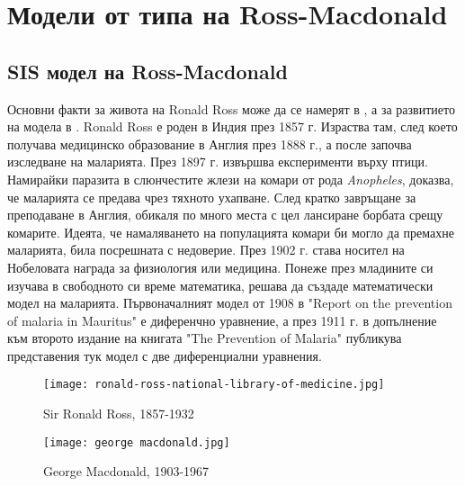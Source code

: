 \section{\hspace{1em} Модели от типа на Ross-Macdonald}

\subsection{SIS модел на Ross-Macdonald}

Основни факти за живота на Ronald Ross може да се намерят в \cite[глава~12]{Bacaer2011}, а за развитието на модела в \cite{Smith2012}.
Ronald Ross е роден в Индия през 1857 г.
Израства там, след което получава медицинско образование в Англия през 1888 г., а после започва изследване на маларията.
През 1897 г. извършва експерименти върху птици.
Намирайки паразита в слюнчестите жлези на комари от рода \textit{Anopheles}, доказва, че маларията се предава чрез тяхното ухапване.
След кратко завръщане за преподаване в Англия, обикаля по много места с цел лансиране борбата срещу комарите. Идеята, че намаляването на популацията комари би могло да премахне маларията, била посрешната с недоверие.
През 1902 г. става носител на Нобеловата награда за физиология или медицина.
Понеже през младините си изучава в свободното си време математика, решава да създаде математически модел на маларията.
Първоначалният модел от 1908 в "Report on the prevention of malaria in Mauritus" е диференчно уравнение, а през 1911 г. в допълнение към второто издание на книгата "The Prevention of Malaria" публикува представения тук модел с две диференциални уравнения.



\begin{figure}[H]
  \centering
  \begin{minipage}{.5\textwidth}
    \centering
    \texttt{[image: ronald-ross-national-library-of-medicine.jpg]}
    \caption{Sir Ronald Ross, 1857-1932}
    \label{fig:Ross}
    \end{minipage}%
    \begin{minipage}{.5\textwidth}
    \centering
    \texttt{[image: george macdonald.jpg]}
    \caption{George Macdonald, 1903-1967}
    \label{fig:Macdonald}
  \end{minipage}
\end{figure}

